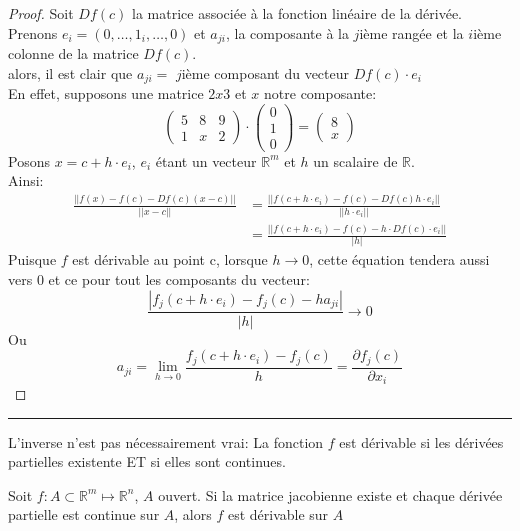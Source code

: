 \documentclass[12pt]{report}
\let\Bbb\mathbb
\theoremstyle{definition}
\newenvironment{preuve}{\renewcommand{\proofname}{Preuve}\begin{proof}}{\end{proof}\noindent\textcolor[RGB]{220,220,220}{\rule{\textwidth}{1pt}}}
\begin{document}
    \begin{preuve}
        Soit $Df(c)$ la matrice associée à la fonction linéaire de la dérivée. \\
        Prenons $e_i = (0,\dots,1_i, \dots,0)$ et $a_{ji}$, la composante à la $j$ième rangée et la $i$ième colonne de la matrice $Df(c)$. \\
        alors, il est clair que $a_{ji} = $ $j$ième composant du vecteur $Df(c) \cdot e_i$\\
        En effet, supposons une matrice $2x3$ et $x$ notre composante:
        $$ \begin{pmatrix}
            5 & 8 & 9 \\
            1 & x & 2 
        \end{pmatrix} \cdot \begin{pmatrix}0 \\ 1 \\ 0\end{pmatrix} = \begin{pmatrix}
            8 \\
            x
        \end{pmatrix}$$
        Posons $x = c + h \cdot e_i$, $e_i$ étant un vecteur $\Bbb R^m$ et $h$ un scalaire de $\Bbb R$.\\
        Ainsi: 
        \begin{align*}
        \frac{||f(x) - f(c) - Df(c)(x - c)||}{||x - c||} &= \frac{||f(c + h\cdot e_i) - f(c) - Df(c)h\cdot e_i||}{||h\cdot e_i||} \\
        &= \frac{||f(c + h\cdot e_i) - f(c) - h \cdot Df(c) \cdot e_i||}{|h|} 
        \end{align*}
        Puisque $f$ est dérivable au point c, lorsque $h \to 0$, cette équation tendera aussi vers 0 et ce pour tout 
        les composants du vecteur:
        $$ \frac{|f_j(c + h\cdot e_i) - f_j(c) -ha_{ji}|}{|h|} \to 0$$
        Ou 
        $$ a_{ji} = \lim_{h \to 0} \frac{f_j(c + h\cdot e_i) - f_j(c)}{h} = \frac{\partial f_j(c)}{\partial x_i} $$
    \end{preuve}
    \begin{attention}
        L'inverse n'est pas nécessairement vrai: La fonction $f$ est dérivable si les 
        dérivées partielles existente ET si elles sont continues.
    \end{attention}
    \begin{prop}
        Soit $f: A \subset \Bbb R^m \mapsto \Bbb R^n$, $A$ ouvert.
        Si la matrice jacobienne existe et chaque dérivée partielle est continue sur $A$, alors 
        $f$ est dérivable sur $A$
    \end{prop}
\end{document}
